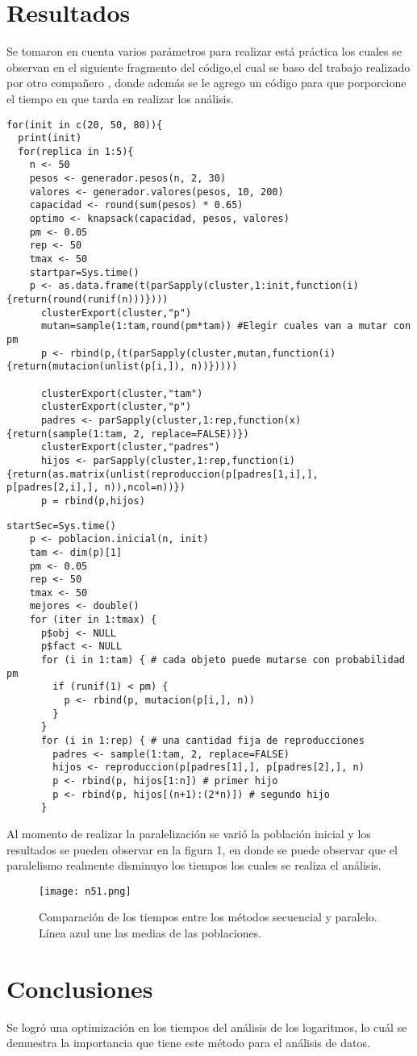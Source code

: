 \documentclass{article}
\begin{document}
\section{Resultados}
Se tomaron en cuenta varios parámetros para realizar está práctica los cuales se observan en el siguiente fragmento del código,el cual se baso del trabajo realizado por otro compañero \cite{REF2}, donde además se le agrego un código para que porporcione el tiempo en que tarda en realizar los análisis.
\begin{lstlisting}[frame=single]
for(init in c(20, 50, 80)){
  print(init)
  for(replica in 1:5){
    n <- 50
    pesos <- generador.pesos(n, 2, 30)
    valores <- generador.valores(pesos, 10, 200)
    capacidad <- round(sum(pesos) * 0.65)
    optimo <- knapsack(capacidad, pesos, valores)
    pm <- 0.05    
    rep <- 50
    tmax <- 50
    startpar=Sys.time()
    p <- as.data.frame(t(parSapply(cluster,1:init,function(i){return(round(runif(n)))})))
      clusterExport(cluster,"p")
      mutan=sample(1:tam,round(pm*tam)) #Elegir cuales van a mutar con pm
      p <- rbind(p,(t(parSapply(cluster,mutan,function(i){return(mutacion(unlist(p[i,]), n))}))))
      
      clusterExport(cluster,"tam")
      clusterExport(cluster,"p") 
      padres <- parSapply(cluster,1:rep,function(x){return(sample(1:tam, 2, replace=FALSE))}) 
      clusterExport(cluster,"padres")
      hijos <- parSapply(cluster,1:rep,function(i){return(as.matrix(unlist(reproduccion(p[padres[1,i],], p[padres[2,i],], n)),ncol=n))})
      p = rbind(p,hijos)
\end{lstlisting}
\begin{lstlisting}[frame=single]
startSec=Sys.time()
    p <- poblacion.inicial(n, init)
    tam <- dim(p)[1]
    pm <- 0.05
    rep <- 50
    tmax <- 50
    mejores <- double()
    for (iter in 1:tmax) {
      p$obj <- NULL
      p$fact <- NULL
      for (i in 1:tam) { # cada objeto puede mutarse con probabilidad pm
        if (runif(1) < pm) {
          p <- rbind(p, mutacion(p[i,], n))
        }
      }
      for (i in 1:rep) { # una cantidad fija de reproducciones
        padres <- sample(1:tam, 2, replace=FALSE)
        hijos <- reproduccion(p[padres[1],], p[padres[2],], n)
        p <- rbind(p, hijos[1:n]) # primer hijo
        p <- rbind(p, hijos[(n+1):(2*n)]) # segundo hijo
      }
\end{lstlisting}
Al momento de realizar la paralelización se varió la población inicial y los resultados se pueden observar en la figura 1, en donde se puede observar que el paralelismo realmente disminuyo los tiempos los cuales se realiza el análisis. 
\begin{figure}[H]
\centering
\texttt{[image: n51.png]}
\caption{Comparación de los tiempos entre los métodos secuencial y paralelo. Línea azul une las medias de las poblaciones.}
\end{figure}



\section{Conclusiones}
Se logró una optimización en los tiempos del análisis de los logaritmos, lo cuál se demuestra la importancia que tiene este método para el análisis de datos.


\end{document}
